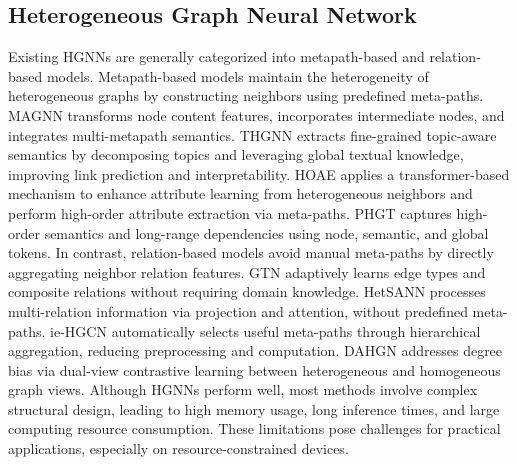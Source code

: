 \documentclass[letterpaper]{article} %
\begin{document}
\subsection{Heterogeneous Graph Neural Network}
Existing HGNNs are generally categorized into metapath-based and relation-based models.
Metapath-based models maintain the heterogeneity of heterogeneous graphs by constructing neighbors using predefined meta-paths. MAGNN \cite{bib18} transforms node content features, incorporates intermediate nodes, and integrates multi-metapath semantics. THGNN \cite{bib19} extracts fine-grained topic-aware semantics by decomposing topics and leveraging global textual knowledge, improving link prediction and interpretability. HOAE \cite{bib20} applies a transformer-based mechanism to enhance attribute learning from heterogeneous neighbors and perform high-order attribute extraction via meta-paths. PHGT \cite{bib21} captures high-order semantics and long-range dependencies using node, semantic, and global tokens. In contrast, relation-based models avoid manual meta-paths by directly aggregating neighbor relation features. GTN \cite{bib22} adaptively learns edge types and composite relations without requiring domain knowledge. HetSANN \cite{bib23} processes multi-relation information via projection and attention, without predefined meta-paths. ie-HGCN \cite{bib24} automatically selects useful meta-paths through hierarchical aggregation, reducing preprocessing and computation. DAHGN\cite{bib25} addresses degree bias via dual-view contrastive learning between heterogeneous and homogeneous graph views. Although HGNNs perform well, most methods involve complex structural design, leading to high memory usage, long inference times, and large computing resource consumption. These limitations pose challenges for practical applications, especially on resource-constrained devices.
\end{document}
